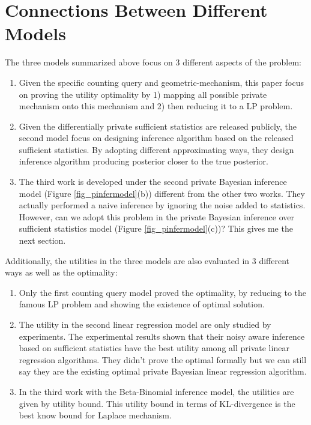 \documentclass{article}
\begin{document}
\section{Connections Between Different Models}
The three models summarized above focus on 3 different aspects of the problem:
\begin{enumerate} 
\item Given the specific counting query and geometric-mechanism, this paper focus on proving the utility optimality by 
1) mapping all possible private mechanism onto this mechanism and 2) then reducing it to a LP problem.
%
\item Given the differentially private sufficient statistics are released publicly, 
the second model focus on designing inference algorithm based on the released sufficient statistics. 
By adopting different approximating ways, they design inference algorithm producing posterior closer to the true posterior.
%
\item The third work is developed under the second private Bayesian inference model (Figure \ref{fig_pinfermodel}(b)) different from the other two works.
They actually performed a naive inference by ignoring the noise added to statistics.
However, can we adopt this problem in the private Bayesian inference over sufficient statistics model (Figure \ref{fig_pinfermodel}(c))?
This gives me the next section.
\end{enumerate}

Additionally, the utilities in the three models are also evaluated in 3 different ways as well as the optimality:
\begin{enumerate} 
\item Only the first counting query model proved the optimality,
by reducing to the famous LP problem and showing the existence of optimal solution.
%
\item The utility in the second linear regression model are only studied by experiments. 
The experimental results shown that their noisy aware inference based on sufficient statistics
have the best utility among all private linear regression algorithms.
They didn't prove the optimal formally but we can still say they are the existing optimal private Bayesian linear regression algorithm.
%
\item In the third work with the Beta-Binomial inference model, the utilities are given by utility bound. This utility bound in terms of KL-divergence is the best know bound for Laplace mechanism.
\end{enumerate}
%
\end{document}
